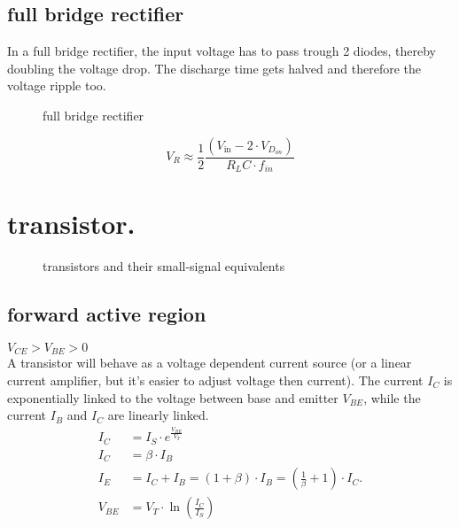 \documentclass[11ypt]{extarticle}
\begin{document}
\subsection{full bridge rectifier}

In a full bridge rectifier, the input voltage has to pass trough 2 diodes, thereby doubling the voltage drop. The discharge time gets halved and therefore the voltage ripple too.

\begin{figure}[H]{}
    \centering
	
    \caption{full bridge rectifier}
\end{figure}

\begin{equation}
    V_R \approx \frac{1}{2}\frac{(V_\text{in} - 2\cdot V_{D_{on}})}{R_LC\cdot f_{in}}
\end{equation}

\section{transistor.}

\begin{figure}[H]{}
    \centering
    
    \caption{transistors and their small-signal equivalents}
\end{figure}

\subsection{forward active region}

$ V_{CE} > V_{BE} > 0 $
\\
A transistor will behave as a voltage dependent current source (or a linear current amplifier, but it's easier to adjust voltage then current). The current $I_C$ is exponentially linked to the voltage between base and emitter $V_{BE}$, while the current $I_B$ and $I_C$ are linearly linked. 
\begin{equation}
\begin{aligned}
    I_C &= I_S \cdot e^{\frac{V_{BE}}{V_T}}
    \\
    I_C &= \beta \cdot I_B
    \\
    I_E &= I_C + I_B = (1+\beta)\cdot I_B = \left( \frac{1}{\beta} + 1 \right) \cdot I_C.
    \\
    V_{BE} &= V_T \cdot \ln{\left( \frac{I_C}{I_S}\right)}
\end{aligned}
\end{equation}
\end{document}
